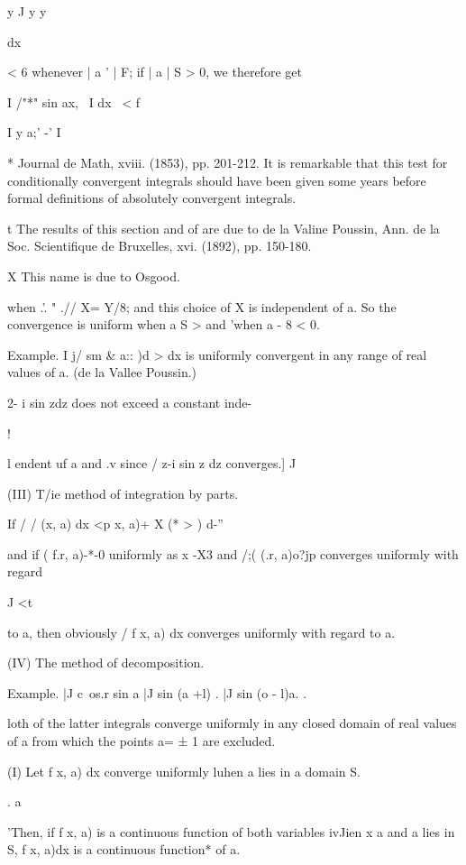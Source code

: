 y J y y

dx

< 6 whenever | a ' | F; if | a | S > 0, we therefore get

I /"*" sin ax, \ I dx \ < f

I y a;' -' I

* Journal de Math, xviii. (1853), pp. 201-212. It is remarkable that
this test for conditionally convergent integrals should have been
given some years before formal definitions of absolutely convergent
integrals.

t The results of this section and of are due to de la Valine
Poussin, Ann. de la Soc. Scientifique de Bruxelles, xvi. (1892), pp.
150-180.

X This name is due to Osgood.

%
%

when .'. " .// X= Y/8; and this choice of X is independent of a. So
the convergence is uniform when a S > and 'when a - 8 < 0.

Example. I j/ sm \& a:: )d > dx is uniformly convergent in any range
of real values of a. (de la Vallee Poussin.)

2- i sin zdz does not exceed a constant inde-

!

l endent uf a and .v since / z-i sin z dz converges.] J

(III) T/ie method of integration by parts.

If / / (x, a) dx <p x, a)+ X (* > ) d-''

and if ( f.r, a)-*-0 uniformly as x -X3 and /;( (.r, a)o?jp converges
uniformly with regard

J <t

to a, then obviously / f x, a) dx converges uniformly with regard to
a.

(IV) The method of decomposition.

Example. |J c\ os.r sin a |J sin (a +l) . |J sin (o - l)a. .

loth of the latter integrals converge uniformly in any closed domain
of real values of a from which the points a= ± 1 are excluded.

(I)
Let f x, a) dx converge uniformly luhen a lies in a domain S.

. a

'Then, if f x, a) is a continuous function of both variables ivJien x
a and a lies in S, f x, a)dx is a continuous function* of a.

